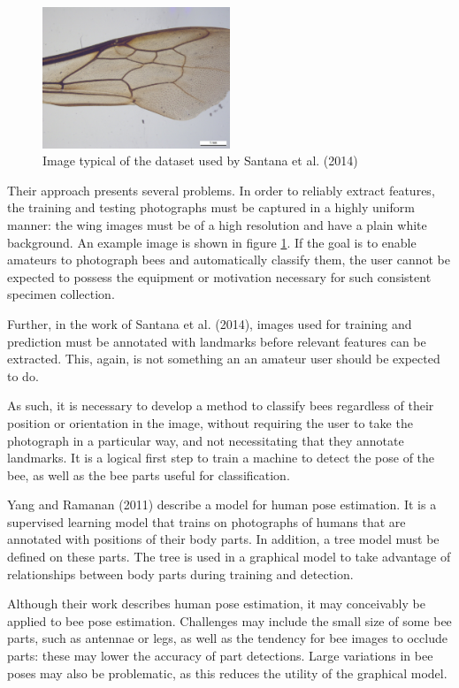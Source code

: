 \documentclass[11pt, oneside]{report}
\begin{document}
    \begin{figure}
        \includegraphics[width=0.5\textwidth]{santana.jpg}
        \caption{Image typical of the dataset used by Santana et al. (2014)}
        \label{fig:santana_example}
    \end{figure}

    Their approach presents several problems. In order to reliably extract features, the training and testing photographs must be captured in a highly uniform manner: the wing images must be of a high resolution and have a plain white background. An example image is shown in figure \ref{fig:santana_example}. If the goal is to enable amateurs to photograph bees and automatically classify them, the user cannot be expected to possess the equipment or motivation necessary for such consistent specimen collection.

    Further, in the work of Santana et al. (2014), images used for training and prediction must be annotated with landmarks before relevant features can be extracted. This, again, is not something an an amateur user should be expected to do.

    As such, it is necessary to develop a method to classify bees regardless of their position or orientation in the image, without requiring the user to take the photograph in a particular way, and not necessitating that they annotate landmarks. It is a logical first step to train a machine to detect the pose of the bee, as well as the bee parts useful for classification.

    Yang and Ramanan (2011) describe a model for human pose estimation. It is a supervised learning model that trains on photographs of humans that are annotated with positions of their body parts. In addition, a tree model must be defined on these parts. The tree is used in a graphical model to take advantage of relationships between body parts during training and detection.

    Although their work describes human pose estimation, it may conceivably be applied to bee pose estimation. Challenges may include the small size of some bee parts, such as antennae or legs, as well as the tendency for bee images to occlude parts: these may lower the accuracy of part detections. Large variations in bee poses may also be problematic, as this reduces the utility of the graphical model.
\end{document}
